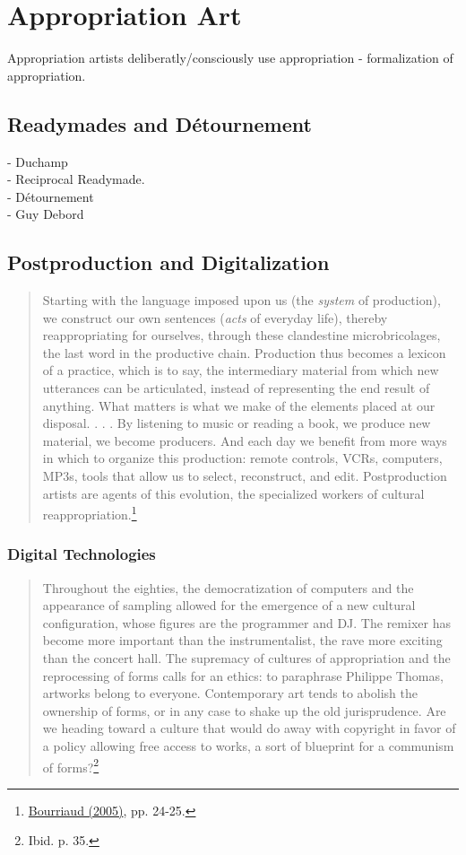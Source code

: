 \section{Appropriation Art}

Appropriation artists deliberatly/consciously use appropriation - formalization of appropriation. 

\subsection {Readymades and D\'etournement}

- Duchamp \\
- Reciprocal Readymade.\\
- D\'etournement \\
- Guy Debord \\

\subsection {Postproduction and Digitalization}

\begin{quote}
Starting with the language imposed upon us (the \emph{system} of production), we construct our own sentences (\emph{acts} of everyday life), thereby reappropriating for ourselves, through these clandestine microbricolages, the last word in the productive chain. Production thus becomes a lexicon of a practice, which is to say, the intermediary material from which new utterances can be articulated, instead of representing the end result of anything. What matters is what we make of the elements placed at our disposal. . . . By listening to music or reading a book, we produce new material, we become producers. And each day we benefit from more ways in which to organize this production: remote controls, VCRs, computers, MP3s, tools that allow us to select, reconstruct, and edit. Postproduction artists are agents of this evolution, the specialized workers of cultural reappropriation.\footnote{\hyperlink{postproduction}{Bourriaud (2005)}, pp. 24-25.}
\end{quote}

\subsubsection{Digital Technologies}

\begin{quote}
Throughout the eighties, the democratization of computers and the appearance of sampling allowed for the emergence of a new cultural configuration, whose figures are the programmer and DJ. The remixer has become more important than the instrumentalist, the rave more exciting than the concert hall. The supremacy of cultures of appropriation and the reprocessing of forms calls for an ethics: to paraphrase Philippe Thomas, artworks belong to everyone. Contemporary art tends to abolish the ownership of forms, or in any case to shake up the old jurisprudence. Are we heading toward a culture that would do away with copyright in favor of a policy allowing free access to works, a sort of blueprint for a communism of forms?\footnote{Ibid. p. 35.}
\end{quote}

